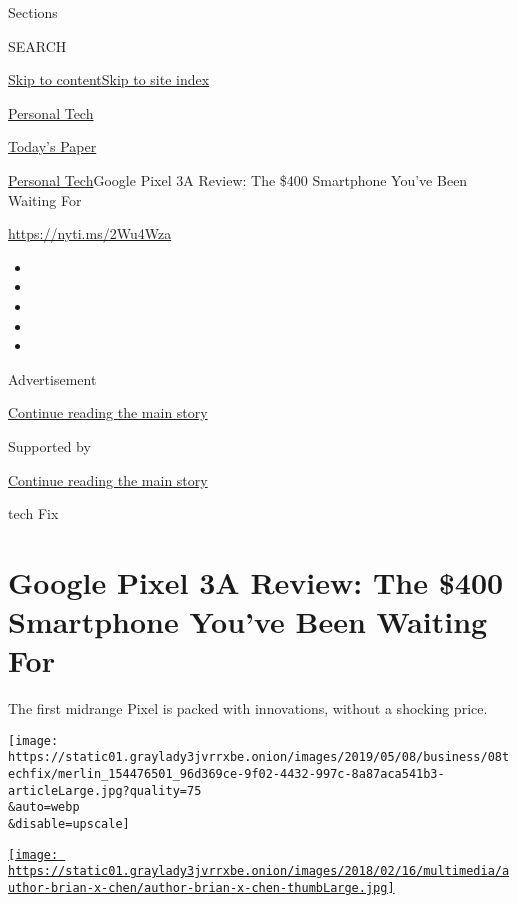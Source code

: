 Sections

SEARCH

\protect\hyperlink{site-content}{Skip to
content}\protect\hyperlink{site-index}{Skip to site index}

\href{https://www.nytimes3xbfgragh.onion/section/technology/personaltech}{Personal
Tech}

\href{https://myaccount.nytimes3xbfgragh.onion/auth/login?response_type=cookie\&client_id=vi}{}

\href{https://www.nytimes3xbfgragh.onion/section/todayspaper}{Today's
Paper}

\href{/section/technology/personaltech}{Personal Tech}\textbar{}Google
Pixel 3A Review: The \$400 Smartphone You've Been Waiting For

\href{https://nyti.ms/2Wu4Wza}{https://nyti.ms/2Wu4Wza}

\begin{itemize}
\item
\item
\item
\item
\item
\end{itemize}

Advertisement

\protect\hyperlink{after-top}{Continue reading the main story}

Supported by

\protect\hyperlink{after-sponsor}{Continue reading the main story}

tech Fix

\hypertarget{google-pixel-3a-review-the-400-smartphone-youve-been-waiting-for}{%
\section{Google Pixel 3A Review: The \$400 Smartphone You've Been
Waiting
For}\label{google-pixel-3a-review-the-400-smartphone-youve-been-waiting-for}}

The first midrange Pixel is packed with innovations, without a shocking
price.

\texttt{[image: https://static01.graylady3jvrrxbe.onion/images/2019/05/08/business/08techfix/merlin\_154476501\_96d369ce-9f02-4432-997c-8a87aca541b3-articleLarge.jpg?quality=75\\\&auto=webp\\\&disable=upscale]}

\href{https://www.nytimes3xbfgragh.onion/by/brian-x-chen}{\texttt{[image: https://static01.graylady3jvrrxbe.onion/images/2018/02/16/multimedia/author-brian-x-chen/author-brian-x-chen-thumbLarge.jpg]}}


